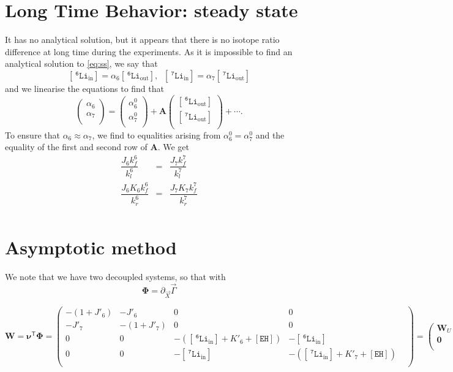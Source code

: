 \documentclass[aps,onecolumn,11pt]{revtex4}
\newcommand{\mychem}[1]{\mathtt{#1}}
\newcommand{\myconc}[1]{\left\lbrack{#1}\right\rbrack}
\newcommand{\spLi}[1]{{~^{\mychem{#1}}\mychem{Li}}}
\newcommand{\spLiIn}[1]{{\spLi{#1}}_{\mathrm{in}}}
\newcommand{\LiIn}[1]{\myconc{\spLiIn{#1}}}
\newcommand{\spLiOut}[1]{{\spLi{#1}}_{\mathrm{out}}}
\newcommand{\LiOut}[1]{\myconc{\spLiOut{#1}}}
\newcommand{\spEHin}{\mychem{EH}}
\newcommand{\EHin}{\myconc{\spEHin}}
\newcommand{\mytrn}[1]{{#1}^{\!\mathsf{T}}}
\newcommand{\mymat}[1]{{\bm{#1}}}
\begin{document}
\section{Long Time Behavior: steady state}
It has no analytical solution, but it appears that there is no isotope ratio difference at
long time during the experiments.
As it is impossible to find an analytical solution to \eqref{eq:ss}, we say that
\begin{equation}
	\LiIn{6} = \alpha_6 \LiOut{6},\;\;\LiIn{7}=\alpha_7\LiOut{7}
\end{equation}
and we linearise the equations to find that
\begin{equation}
	\begin{pmatrix}
	\alpha_6\\
	\alpha_7\\
	\end{pmatrix}
	=
	\begin{pmatrix}
	\alpha_6^0\\
	\alpha_7^0\\
	\end{pmatrix}
	+
	\mymat{A} 
	\begin{pmatrix}
	\LiOut{6}\\
	\LiOut{7}\\
	\end{pmatrix}
	+\cdots.
\end{equation}
To ensure that $\alpha_6\approx\alpha_7$, we find to equalities arising from $\alpha_6^0=\alpha_7^0$ and 
the equality of the first and second row of $\mymat{A}$.
We get
\begin{equation}
\begin{array}{rcl}
	\dfrac{J_6 k_f^6}{k_l^6}  & = & \dfrac{J_7 k_f^7}{k_l^7}\\
	\dfrac{J_6K_6k_f^6}{k_r^6} & = & \dfrac{J_7K_7k_f^7}{k_r^7}\\
\end{array}
\end{equation}

\section{Asymptotic method}
We note that we have two decoupled systems,
so that with
\begin{equation}
	\mymat{\Phi} = \partial_{\vec{X}} \vec{\Gamma}
\end{equation}

\begin{equation}
\mymat{W} = \mytrn{\mymat{\nu}} \mymat{\Phi} = 
\begin{pmatrix}
	-(1+J'_6) & -J'_6 & 0 & 0\\
	-J'_7 & -(1+J'_7) & 0 & 0\\
	0 & 0 & -(\LiIn{6}+K'_6+\EHin) & -\LiIn{6}\\
	0 & 0 & -\LiIn{7} & -(\LiIn{7}+K'_7+\EHin) & \\
\end{pmatrix}
= \begin{pmatrix}
\mymat{W}_U & \mymat{0}\\
\mymat{0} & \mymat{W}_L\\
\end{pmatrix}
\end{equation}
\end{document}
